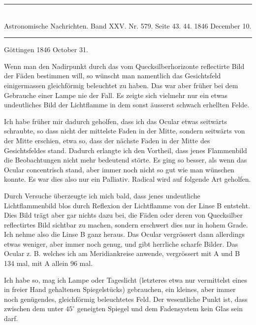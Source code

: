 \clearpage
{}
\begin{center}
\rule{0.55\linewidth}{0.4pt}\\[2pt]
Astronomische Nachrichten. Band XXV. Nr. 579. Seite 43. 44. 1846 December 10.\\[2pt]
\rule{0.55\linewidth}{0.4pt}
\end{center}
\begin{flushright}Göttingen 1846 October 31.\end{flushright}

Wenn man den Nadirpunkt durch das vom Quecksilberhorizonte reflectirte Bild der Fäden bestimmen will, so wünscht man namentlich das Gesichtsfeld einigermassen gleichförmig beleuchtet zu haben. Das war aber früher bei dem Gebrauche einer Lampe nie der Fall. Es zeigte sich vielmehr nur ein etwas undeutliches Bild der Lichtflamme in dem sonst äusserst schwach erhellten Felde.

Ich habe früher mir dadurch geholfen, dass ich das Ocular etwas seitwärts schraubte, so dass nicht der mittelste Faden in der Mitte, sondern seitwärts von der Mitte erschien, etwa so, dass der nächste Faden in der Mitte des Gesichtsfeldes stand. Dadurch erlangte ich den Vortheil, dass jenes Flammenbild die Beobachtungen nicht mehr bedeutend störte. Es ging so besser, als wenn das Ocular concentrisch stand, aber immer noch nicht so gut wie man wünschen konnte. Es war dies also nur ein Palliativ. Radical wird auf folgende Art geholfen.

\begin{center}

\end{center}

Durch Versuche überzeugte ich mich bald, dass jenes undeutliche Lichtflammenbild blos durch Reflexion der Lichtflamme von der Linse B entsteht. Dies Bild trägt aber gar nichts dazu bei, die Fäden oder deren von Quecksilber reflectirtes Bild sichtbar zu machen, sondern erschwert dies nur in hohem Grade. Ich nehme also die Linse B ganz heraus. Das Ocular vergrössert dann allerdings etwas weniger, aber immer noch genug, und gibt herrliche scharfe Bilder. Das Ocular z. B. welches ich am Meridiankreise anwende, vergrössert mit A und B 134 mal, mit A allein 96 mal.

Ich habe so, mag ich Lampe oder Tageslicht (letzteres etwa nur vermittelst eines in freier Hand gehaltenen Spiegelstücks) gebrauchen, ein kleines, aber immer noch genügendes, gleichförmig beleuchtetes Feld. Der wesentliche Punkt ist, dass zwischen dem unter $45^\circ$ geneigten Spiegel und dem Fadensystem kein Glas sein darf.
